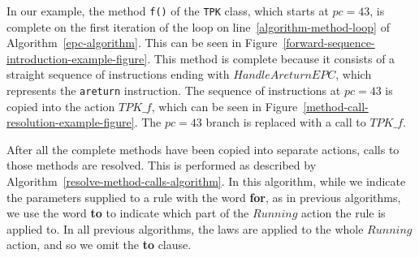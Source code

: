 In our example, the method \texttt{f()} of the \texttt{TPK} class,
which starts at $pc = 43$, is complete on the first iteration of the
loop on line~\ref{algorithm-method-loop} of
Algorithm~\ref{epc-algorithm}.
This can be seen in
Figure~\ref{forward-sequence-introduction-example-figure}.
This method is complete because it consists of a straight sequence of
instructions ending with $HandleAreturnEPC$, which represents the
\texttt{areturn} instruction.
The sequence of instructions at $pc = 43$ is copied into the action
$TPK\_f$, which can be seen in
Figure~\ref{method-call-resolution-example-figure}.
The $pc = 43$ branch is replaced with a call to $TPK\_f$.

After all the complete methods have been copied into separate actions,
calls to those methods are resolved.
This is performed as described by
Algorithm~\ref{resolve-method-calls-algorithm}.
In this algorithm, while we indicate the parameters supplied to a rule
with the word \textbf{for}, as in previous algorithms, we use the word
\textbf{to} to indicate which part of the $Running$ action the rule is
applied to.
In all previous algorithms, the laws are applied to the whole
$Running$ action, and so we omit the \textbf{to} clause.

